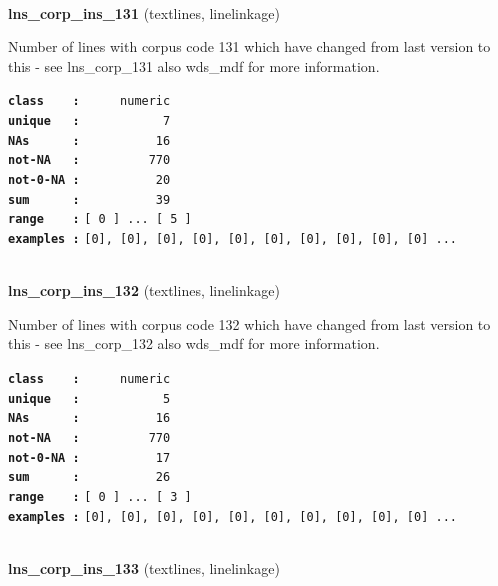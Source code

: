 \documentclass[]{article}
\begin{document}
~

\textbf{lns\_corp\_ins\_131} (textlines, linelinkage)

Number of lines with corpus code 131 which have changed from last
version to this - see lns\_corp\_131 also wds\_mdf for more information.

\textbf{\texttt{class\ \ \ \ :}} \texttt{~~~~~numeric}\\
\textbf{\texttt{unique\ \ \ :}} \texttt{~~~~~~~~~~~7}\\
\textbf{\texttt{NAs\ \ \ \ \ \ :}} \texttt{~~~~~~~~~~16}\\
\textbf{\texttt{not-NA\ \ \ :}} \texttt{~~~~~~~~~770}\\
\textbf{\texttt{not-0-NA\ :}} \texttt{~~~~~~~~~~20}\\
\textbf{\texttt{sum\ \ \ \ \ \ :}} \texttt{~~~~~~~~~~39}\\
\textbf{\texttt{range\ \ \ \ :}}
\texttt{{[}\ 0\ {]}\ ...\ {[}\ 5\ {]}}\\
\textbf{\texttt{examples\ :}}
\texttt{{[}0{]},\ {[}0{]},\ {[}0{]},\ {[}0{]},\ {[}0{]},\ {[}0{]},\ {[}0{]},\ {[}0{]},\ {[}0{]},\ {[}0{]}\ ...}\\

~

\textbf{lns\_corp\_ins\_132} (textlines, linelinkage)

Number of lines with corpus code 132 which have changed from last
version to this - see lns\_corp\_132 also wds\_mdf for more information.

\textbf{\texttt{class\ \ \ \ :}} \texttt{~~~~~numeric}\\
\textbf{\texttt{unique\ \ \ :}} \texttt{~~~~~~~~~~~5}\\
\textbf{\texttt{NAs\ \ \ \ \ \ :}} \texttt{~~~~~~~~~~16}\\
\textbf{\texttt{not-NA\ \ \ :}} \texttt{~~~~~~~~~770}\\
\textbf{\texttt{not-0-NA\ :}} \texttt{~~~~~~~~~~17}\\
\textbf{\texttt{sum\ \ \ \ \ \ :}} \texttt{~~~~~~~~~~26}\\
\textbf{\texttt{range\ \ \ \ :}}
\texttt{{[}\ 0\ {]}\ ...\ {[}\ 3\ {]}}\\
\textbf{\texttt{examples\ :}}
\texttt{{[}0{]},\ {[}0{]},\ {[}0{]},\ {[}0{]},\ {[}0{]},\ {[}0{]},\ {[}0{]},\ {[}0{]},\ {[}0{]},\ {[}0{]}\ ...}\\

~

\textbf{lns\_corp\_ins\_133} (textlines, linelinkage)
\end{document}
